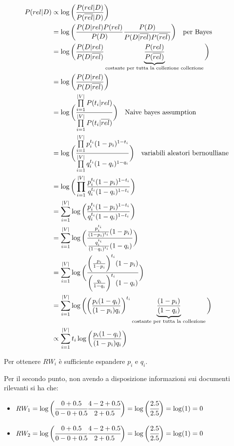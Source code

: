 \begin{align}
P(rel |D) &\propto \log \bigg( \frac{P(rel | D)}{P(\overline{rel} | D)} \bigg) \\
&= \log \bigg(  \frac{P(D | rel)P(rel)}{P(D)}  \frac{P(D)}{P(D | \overline{rel})P(\overline{rel})} \bigg) \quad \text{per Bayes}\\
&= \log \bigg(  \frac{P(D | rel)}{P(D | \overline{rel})}  \underbrace{\frac{P(rel)}{P(\overline{rel})}}_{\text{costante per tutta la collezione collezione}}\bigg)\\
&= \log \bigg(  \frac{P(D | rel)}{P(D | \overline{rel})} \bigg)\\
&= \log \bigg(  \frac{\prod\limits_{i=1}^{|V|} P(t_i | rel)}{\prod\limits_{i=1}^{|V|} P(t_i | \overline{rel})} \bigg) \quad \text{Naive bayes assumption} \\
&= \log \bigg(  \frac{\prod\limits_{i=1}^{|V|} p_i^{t_i}(1-p_i)^{1-t_i}}{\prod\limits_{i=1}^{|V|}q_i^{t_i}(1-q_i)^{1-q_i}} \bigg) \quad \text{variabili aleatori bernoulliane}\\
&= \log \bigg( \prod\limits_{i=1}^{|V|} \frac{ p_i^{t_i}(1-p_i)^{1-t_i}}{q_i^{t_i}(1-q_i)^{1-t_i}} \bigg)  \\
&= \sum\limits_{i=1}^{|V|} \log \bigg(  \frac{ p_i^{t_i}(1-p_i)^{1-t_i}}{q_i^{t_i}(1-q_i)^{1-t_i}} \bigg)\\
&= \sum\limits_{i=1}^{|V|} \log \bigg(  \frac{ \frac{p_i^{t_i}}{(1-p_i)^{t_i}}(1-p_i)  }{ \frac{q_i^{t_i}}{(1-q_i)^{t_i}}(1-q_i)  } \bigg)\\
&= \sum\limits_{i=1}^{|V|} \log \bigg(  \frac{ \bigg(\frac{p_i}{1-p_i} \bigg)^{t_i}  (1-p_i) }{ \bigg(\frac{q_i}{1-q_i}\bigg)^{t_i} (1-q_i)  } \bigg)\\
&= \sum\limits_{i=1}^{|V|} \log \bigg(   \bigg(\frac{p_i(1-q_i)}{(1-p_i)q_i} \bigg)^{t_i}  \underbrace{\frac{(1-p_i)}{(1-q_i) }}_{\text{costante per tutta la collezione}} \bigg)\\
&\propto \sum\limits_{i=1}^{|V|} t_i \log \bigg( \frac{p_i(1-q_i)}{(1-p_i)q_i} \bigg)
\end{align}

Per ottenere $RW_i$ è sufficiente espandere $p_i$ e $q_i$.

Per il secondo punto, non avendo a disposizione informazioni sui documenti rilevanti si ha che:

\begin{itemize}
\item $RW_1 = \log \bigg( \cfrac{0 + 0.5}{0 - 0 +0.5} \cfrac{4 - 2 + 0.5}{2 +0.5} \bigg) = \log\bigg(\cfrac{2.5}{2.5}\bigg) = \log(1) = 0$
\item $RW_2 = \log \bigg( \cfrac{0 + 0.5}{0 - 0 +0.5} \cfrac{4 - 2 + 0.5}{2 +0.5} \bigg) = \log\bigg(\cfrac{2.5}{2.5}\bigg) = \log(1) = 0$
\end{itemize}

